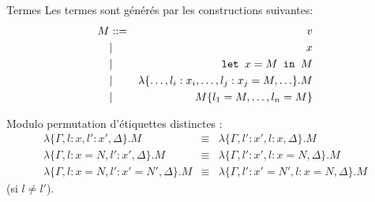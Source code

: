\documentclass{beamer}
\newcommand{\letin}[3]{\text{\texttt{let }} #1 = #2 \text{\texttt{ in }} #3}
\begin{document}
\begin{ssl}{Termes}
Les termes sont générés par les constructions suivantes:
\begin{eqnarray*}
  M &::=& v \\
  &|& x \\
  &|& \letin{x}{M}{M} \\
  &|& \lambda \{\ldots, l_i:x_i, \ldots, l_j:x_j=M, \ldots\}.M \\
  &|& M\{l_1=M,\ldots,l_n=M\}
\end{eqnarray*}


Modulo permutation d'étiquettes distinctes :
{\small
\begin{equation*}
  \label{eq:permutation}
  \begin{array}{rcl}
    \lambda \{ \Gamma, l:x, l':x', \Delta \}.M & \equiv &
    \lambda \{ \Gamma, l':x', l:x, \Delta \}.M \\
    \lambda \{ \Gamma, l:x=N, l':x', \Delta \}.M & \equiv &
    \lambda \{ \Gamma, l':x', l:x=N, \Delta \}.M \\
    \lambda \{ \Gamma, l:x=N, l':x'=N', \Delta \}.M & \equiv &
    \lambda \{ \Gamma, l':x'=N', l:x=N, \Delta \}.M
  \end{array}
\end{equation*}
}
(si $l\neq l'$).
\end{ssl}
\end{document}
